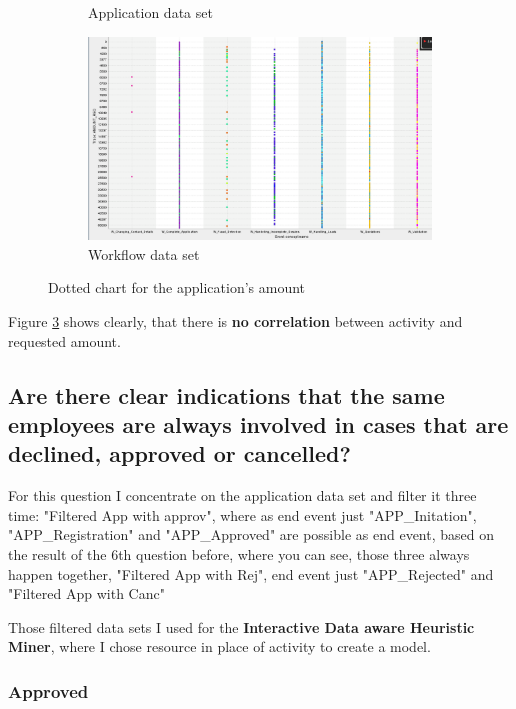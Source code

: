 \begin{figure}[!htbp]
\begin{subfigure}{0.49\textwidth}
\caption{Application data set}
\label{fig:AmounApp}
\end{subfigure}
\begin{subfigure}{0.49\textwidth}
\includegraphics[width = 0.99\linewidth]{AmountRequ_Work.PNG}
\caption{Workflow data set}
\label{fig:AmounWhole}
\end{subfigure}
\caption{Dotted chart for the application's amount}
\label{fig:DotAmount}
\end{figure}

Figure \ref{fig:DotAmount} shows clearly, that there is \textbf{no correlation} between activity and requested amount. 

\subsection{Are there clear indications that the same employees are always involved in cases that are declined, approved or cancelled?}

For this question I concentrate on the application data set and filter it three time: "Filtered App with approv", where as end event just "APP\_Initation", "APP\_Registration" and "APP\_Approved" are possible as end event, based on the result of the 6th question before, where you can see, those three always happen together, "Filtered App with Rej", end event just "APP\_Rejected" and "Filtered App with Canc"

Those filtered data sets I used for the \textbf{Interactive Data aware Heuristic Miner}, where I chose resource in place of activity to create a model.

\subsubsection{Approved}

